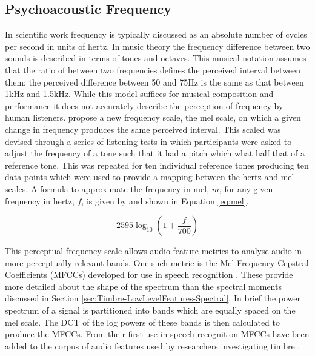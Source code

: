 	\subsection{Psychoacoustic Frequency}
	\label{sec:Timbre-PsychoacousticPrinciples-Frequency}
		In scientific work frequency is typically discussed as an absolute number of cycles per second in units of
		hertz. In music theory the frequency difference between two sounds is described in terms of tones and
		octaves.  This musical notation assumes that the ratio of between two frequencies defines the perceived
		interval between them: the perceived difference between 50 and 75Hz is the same as that between 1kHz and
		1.5kHz.  While this model suffices for musical composition and performance it does not accurately describe
		the perception of frequency by human listeners. \citep{stevens1937a} propose a new frequency scale, the mel
		scale, on which a given change in frequency produces the same perceived interval. This scaled was devised
		through a series of listening tests in which participants were asked to adjust the frequency of a tone such
		that it had a pitch which what half that of a reference tone. This was repeated for ten individual
		reference tones producing ten data points which were used to provide a mapping between the hertz and mel
		scales. A formula to approximate the frequency in mel, $m$, for any given frequency in hertz, $f$, is given
		by \citet{oshaughnessy2000speech} and shown in Equation \ref{eq:mel}.

		\begin{equation}
			2595 \log_{10} \left(1 + \frac{f}{700} \right)
			\label{eq:mel}
		\end{equation}

		This perceptual frequency scale allows audio feature metrics to analyse audio in more perceptually relevant
		bands. One such metric is the Mel Frequency Cepstral Coefficients (MFCCs) developed for use in speech
		recognition \citep{davis1980comparison}. These provide more detailed about the shape of the spectrum than
		the spectral moments discussed in Section \ref{sec:Timbre-LowLevelFeatures-Spectral}. In brief the power
		spectrum of a signal is partitioned into bands which are equally spaced on the mel scale. The DCT of the
		log powers of these bands is then calculated to produce the MFCCs. From their first use in speech
		recognition MFCCs have been added to the corpus of audio features used by researchers investigating timbre
		\citep{depoli1997sonological}. 

